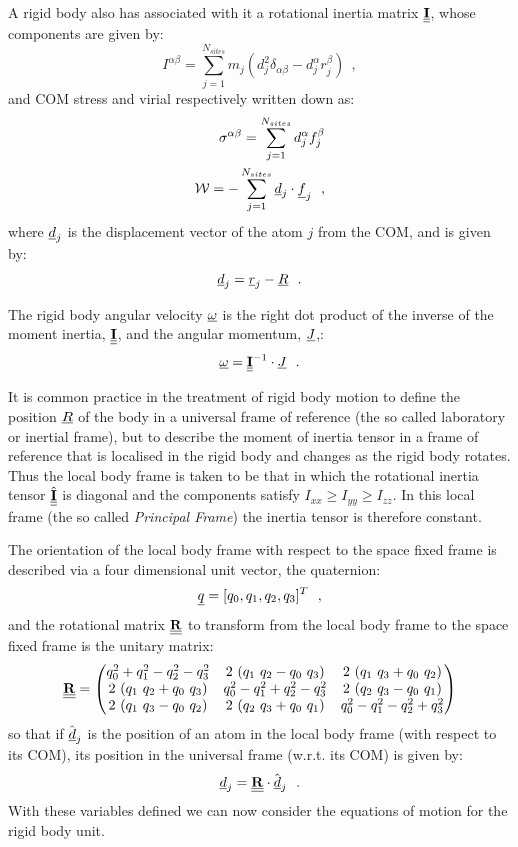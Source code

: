 A rigid body also has associated with it a
rotational inertia matrix $\mbox{$\underline{\underline{\bf I}}$}$, whose components are given by:
\begin{equation}
I^{\alpha\beta}=\sum_{j=1}^{N_{sites}} m_{j} (d_{j}^{2}
\delta_{\alpha \beta}-d_{j}^{\alpha} r_{j}^{\beta})~~,
\end{equation}
and COM stress and virial respectively written down as:
\begin{eqnarray}
\sigma^{\alpha\beta}=\sum_{j=1}^{N_{sites}} d_{j}^{\alpha} f_{j}^{\beta} \nonumber \\
{\cal W} = -\sum_{j=1}^{N_{sites}} \mbox{$\underline{d}$}_{j} \cdot \mbox{$\underline{f}$}_{j}~~,
\end{eqnarray}
where $\mbox{$\underline{d}$}_{j}$ is the displacement vector of the atom $j$ from the
COM, and is given by:
\begin{equation}
\mbox{$\underline{d}$}_{j}=\mbox{$\underline{r}$}_{j}-\mbox{$\underline{R}$}~~.
\end{equation}

The rigid body angular velocity $\mbox{$\underline{\omega}$}$ is the right dot product of the
inverse of the moment inertia, $\mbox{$\underline{\underline{\bf I}}$}$, and the angular momentum, $\mbox{$\underline{J}$}$,:
\begin{equation}
\mbox{$\underline{\omega}$} =  \mbox{$\underline{\underline{\bf I}}$}^{-1} \cdot \mbox{$\underline{J}$}~~.
\end{equation}

It is common practice in the treatment of rigid body motion to define
the position $\mbox{$\underline{R}$}$ of the body in a universal frame of reference
(the so called laboratory or inertial frame), but to describe the
moment of inertia tensor in a frame of reference that is localised
in the rigid body and changes as the rigid body rotates.  Thus the
local body frame is taken to be that in which the rotational
inertia tensor $\hat{\mbox{$\underline{\underline{\bf I}}$}}$ is diagonal and the components satisfy
$I_{xx} \ge I_{yy} \ge I_{zz}$.  In this local frame (the so called
{\em Principal Frame}) the inertia tensor is therefore constant.

The orientation of the local body frame with respect to the space fixed
frame is described via a four dimensional unit vector, the quaternion:
\begin{equation}
\mbox{$\underline{q}$} = [q_0,q_1,q_2,q_3]^T~~,
\end{equation}
and the rotational matrix $\mbox{$\underline{\underline{\bf R}}$}$ to transform from the local body
frame to the space fixed frame is the unitary matrix:
\begin{equation}
\mbox{$\underline{\underline{\bf R}}$} =
\begin{pmatrix}
 q_0^2+q_1^2-q_2^2-q_3^2 & 2~(q_1~q_2-q_0~q_3)     & 2~(q_1~q_3+q_0~q_2)     \cr
 2~(q_1~q_2+q_0~q_3)     & q_0^2-q_1^2+q_2^2-q_3^2 & 2~(q_2~q_3-q_0~q_1)     \cr
 2~(q_1~q_3-q_0~q_2)     & 2~(q_2~q_3+q_0~q_1)     & q_0^2-q_1^2-q_2^2+q_3^2 \cr
\end{pmatrix}
\end{equation}
so that if $\hat{\mbox{$\underline{d}$}}_{j}$ is the position of an atom in the local
body frame (with respect to its COM), its position in the universal frame
(w.r.t. its COM) is given by:
\begin{equation}
\mbox{$\underline{d}$}_{j} = \mbox{$\underline{\underline{\bf R}}$} \cdot \hat{\mbox{$\underline{d}$}}_{j}~~.
\end{equation}
With these variables defined we can now consider the equations of
motion for the rigid body unit.

